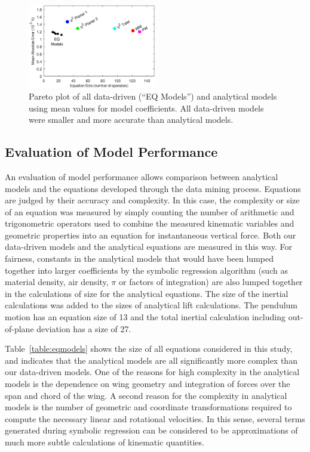 \documentclass{article}
\begin{document}
\begin{figure}
\centering
\includegraphics[width=0.5\textwidth]{figures/mae_nofit}
\caption{Pareto plot of all data-driven (``EQ Models'') and analytical models
  using mean values for model coefficients. All data-driven models were smaller
  and more accurate than analytical models.\label{fig:pareto_mae}}
\end{figure}

\subsection*{Evaluation of Model Performance}
An evaluation of model performance allows comparison between analytical models
and the equations developed through the data mining process.  Equations are
judged by their accuracy and complexity.  In this case, the complexity or size
of an equation was measured by simply counting the number of arithmetic and
trigonometric operators used to combine the measured kinematic variables and
geometric properties into an equation for instantaneous vertical force.  Both
our data-driven models and the analytical equations are measured in this way.
For fairness, constants in the analytical models that would have been lumped
together into larger coefficients by the symbolic regression algorithm (such as
material density, air density, \(\pi\) or factors of integration) are also
lumped together in the calculations of size for the analytical equations. The
size of the inertial calculations was added to the sizes of analytical lift
calculations.  The pendulum motion has an equation size of 13 and the total
inertial calculation including out-of-plane deviation has a size of 27.

Table~\ref{table:eqmodels} shows the size of all equations considered in this
study, and indicates that the analytical models are all significantly more
complex than our data-driven models.  One of the reasons for high complexity in
the analytical models is the dependence on wing geometry and integration of
forces over the span and chord of the wing.  A second reason for the complexity
in analytical models is the number of geometric and coordinate transformations
required to compute the necessary linear and rotational velocities.  In this
sense, several terms generated during symbolic regression can be considered to
be approximations of much more subtle calculations of kinematic quantities.
\end{document}
